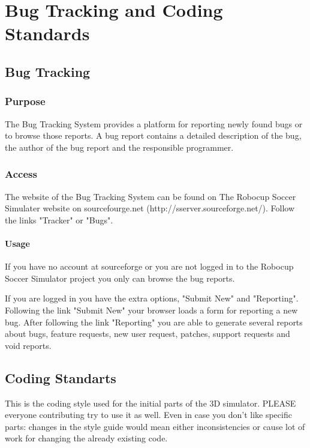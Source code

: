 
\chapter{Bug Tracking and Coding Standards}


\section{Bug Tracking}

\subsection{Purpose}

The Bug Tracking System provides a platform for reporting newly found bugs or to
browse those reports. A bug report contains a detailed description of the bug, the author of the bug report and the responsible programmer.

\subsection{Access}

The website of the Bug Tracking System can be found on The Robocup Soccer Simulater website on sourcefourge.net (http://sserver.sourceforge.net/). Follow the links "Tracker" or "Bugs".

\subsubsection{Usage}

If you have no account at sourceforge or you are not logged in to the Robocup Soccer Simulator project you only can browse the bug reports.

If you are logged in you have the extra options, "Submit New" and "Reporting".
Following the link "Submit New" your browser loads a form for reporting a new bug.
After following the link "Reporting" you are able to generate several reports about
bugs, feature requests, new user request, patches, support requests and void reports.

\section{Coding Standarts}

This is the coding style used for the initial parts of the 3D simulator. PLEASE everyone contributing try to use it as well. Even in case you don't like specific parts: changes in the style guide would mean either inconsistencies or cause lot of work for changing the already existing code. 

